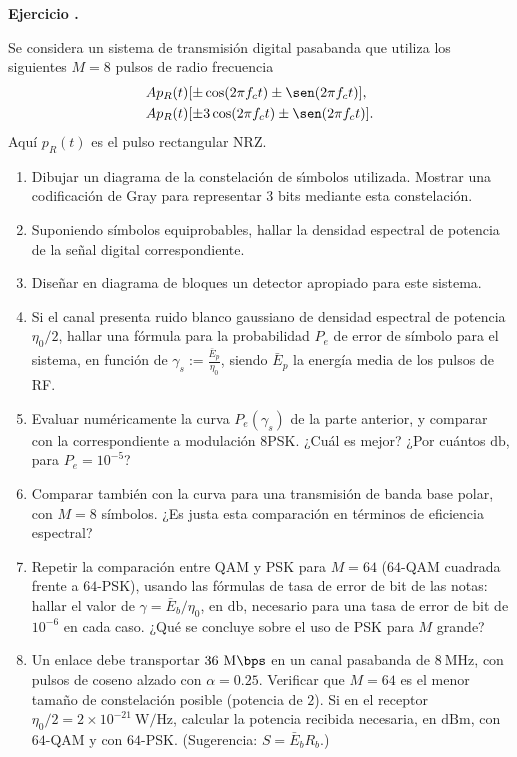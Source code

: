 \documentclass[a4paper,11pt]{article}
\newcounter{numejer}[section]
\newenvironment{ejercicio}[1][]{
\refstepcounter{numejer}
\noindent \large \textbf{Ejercicio \arabic{section}.\arabic{numejer}} \ifthenelse{\equal{#1}{}}{}{\emph{(#1)}}

\smallskip
}{
\bigskip
}
\begin{document}
\begin{ejercicio}
Se considera un sistema de transmisión digital pasabanda que utiliza los siguientes $M=8$ pulsos de radio frecuencia 
\begin{align*} & A p_R(t)[\pm \cos(2\pi f_c t) \pm \sen(2\pi f_c t)],\\ & A p_R(t)[\pm 3\cos(2\pi f_c t)
\pm \sen(2\pi f_c t)].
\end{align*}
Aquí $p_R(t)$ es el pulso rectangular NRZ. 

\begin{enumerate}
\item Dibujar un diagrama de la constelaci{ó}n de s{\'\i}mbolos
utilizada. Mostrar una codificación de Gray para representar 3
bits mediante esta constelación.
\item Suponiendo símbolos equiprobables, hallar la densidad
espectral de potencia de la señal digital correspondiente.
\item Dise{ñ}ar en diagrama de bloques un detector apropiado para este sistema.
\item Si el canal presenta ruido blanco gaussiano de densidad espectral de
potencia $\eta_0/2$, hallar una fórmula para la probabilidad $P_e$
de error de símbolo para el sistema, en función de
$\gamma_s:=\frac{\bar{E}_p}{\eta_0}$, siendo $\bar{E}_p$ la energía
media de los pulsos de RF.
\item Evaluar numéricamente la curva $P_e(\gamma_s)$ de la parte anterior, y comparar con
la correspondiente a modulación 8PSK. ¿Cuál es mejor? ¿Por cuántos $\unit{\decibel}$, para $P_e=10^{-5}$?
\item Comparar también con la curva para una transmisión de banda
base polar, con $M=8$ símbolos. ¿Es justa esta comparación en
términos de eficiencia espectral?
\item Repetir la comparación entre QAM y PSK para $M=64$ ($64$-QAM cuadrada frente a $64$-PSK), usando las fórmulas de tasa de error de bit de las notas: hallar el valor de $\gamma=\bar E_b/\eta_0$, en $\unit{\decibel}$, necesario para una tasa de error de bit de $10^{-6}$ en cada caso. ¿Qué se concluye sobre el uso de PSK para $M$ grande?
\item Un enlace debe transportar $36\ \unit{\mega\bps}$ en un canal pasabanda de $8\ \unit{\mega\hertz}$, con pulsos de coseno alzado con $\alpha=0.25$. Verificar que $M=64$ es el menor tamaño de constelación posible (potencia de $2$). Si en el receptor $\eta_0/2=2\times10^{-21}\ \unit{\watt/\hertz}$, calcular la potencia recibida necesaria, en $\mathrm{dBm}$, con $64$-QAM y con $64$-PSK. (Sugerencia: $S=\bar E_bR_b$.)
\end{enumerate}
\end{ejercicio}
\end{document}
